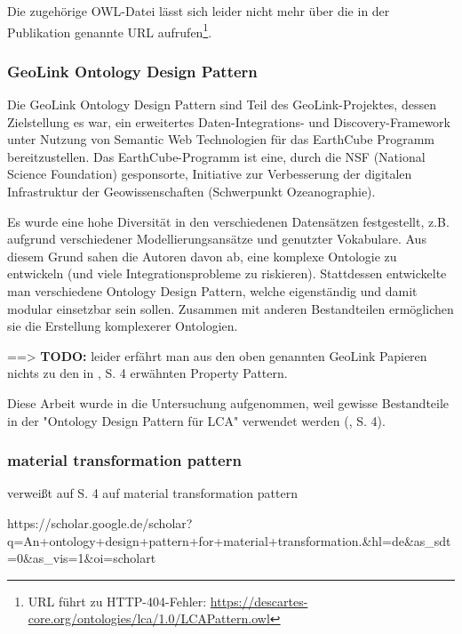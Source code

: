 \documentclass{article}
\begin{document}
Die zugehörige  OWL-Datei lässt sich leider nicht mehr über die in der Publikation genannte URL aufrufen\footnote{URL führt zu HTTP-404-Fehler: \url{https://descartes-core.org/ontologies/lca/1.0/LCAPattern.owl}}.

\subsubsection{GeoLink Ontology Design Pattern}


Die GeoLink Ontology Design Pattern \cite{krisnadhi2015geolinkStart} sind Teil des GeoLink-Projektes, dessen Zielstellung es war, ein erweitertes Daten-Integrations- und Discovery-Framework unter Nutzung von Semantic Web Technologien für das EarthCube Programm bereitzustellen.
Das EarthCube-Programm ist eine, durch die NSF (National Science Foundation) gesponsorte, Initiative zur Verbesserung der digitalen Infrastruktur der Geowissenschaften (Schwerpunkt Ozeanographie).

Es wurde eine hohe Diversität in den verschiedenen Datensätzen festgestellt, z.B. aufgrund verschiedener Modellierungsansätze und genutzter Vokabulare.
Aus diesem Grund sahen die Autoren davon ab, eine komplexe Ontologie zu entwickeln (und viele Integrationsprobleme zu riskieren). Stattdessen entwickelte man verschiedene Ontology Design Pattern, welche eigenständig und damit modular einsetzbar sein sollen.
Zusammen mit anderen Bestandteilen ermöglichen sie die Erstellung komplexerer Ontologien.

==> \textbf{TODO:} leider erfährt man aus den oben genannten GeoLink Papieren nichts zu den in \cite{vardem2015anminimal}, S. 4 erwähnten Property Pattern.

Diese Arbeit wurde in die Untersuchung aufgenommen, weil gewisse Bestandteile in der "Ontology Design Pattern für LCA" verwendet werden (\cite{vardem2015anminimal}, S. 4).

\subsubsection{material transformation pattern}

\cite{vardem2015anminimal} verweißt auf S. 4 auf material transformation pattern

https://scholar.google.de/scholar?q=An+ontology+design+pattern+for+material+transformation.\&hl=de\&as\_sdt=0\&as\_vis=1\&oi=scholart
\end{document}
